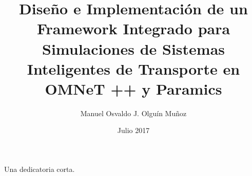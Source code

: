 \documentclass[upright, contnum, latin1]{umemoria}
\author{Manuel Osvaldo J. Olguín Muñoz}
\title{Diseño e Implementación de un Framework Integrado para Simulaciones de Sistemas Inteligentes de Transporte en OMNeT ++ y Paramics}
\date{Julio 2017}
\begin{document}
\frontmatter
\maketitle

\begin{abstract}
\lipsum[1-4]
\end{abstract}

\begin{dedicatoria}
Una dedicatoria corta.
\end{dedicatoria}

\begin{thanks}
\lipsum[1-2]
\end{thanks}

\cleardoublepage
\tableofcontents
\cleardoublepage
\listoftables
\cleardoublepage
\listoffigures

\mainmatter





\nocite{*}
\newpage
\begin{multicols}{2}
    
    
\end{multicols}
\end{document}
